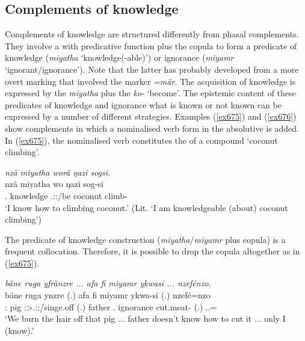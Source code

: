 \subsection{Complements of knowledge}\label{complknow}

Complements of knowledge are structured differently from phasal complements. They involve a  with predicative function plus the copula to form a predicate of knowledge (\emph{miyatha} `knowledge(-able)') or ignorance (\emph{miyamr} `ignorant/ignorance'). Note that the latter has probably developed from a more overt marking that involved the   marker \emph{=mär}. The acquisition of knowledge is expressed by the  \emph{miyatha} plus the  \emph{ko-} `become'. The epistemic content of these predicates of knowledge and ignorance \textendash{} what is known or not known \textendash{} can be expressed by a number of different strategies. Examples (\ref{ex675}) and (\ref{ex676}) show complements in which a nominalised verb form in the absolutive is added. In (\ref{ex675}), the nominalised verb constitutes the  of a compound `coconut climbing'.

\begin{exe}
	\ex \emph{nzä miyatha worä ŋazi sogsi.}\\
	\gll nzä miyatha wo ŋazi sog-si\\
	\Fsg.\Abs{} knowledge \Fsg.\Sbj:\Nonpast:\Ipfv/be coconut climb-\Nmlz{}\\
	\trans `I know how to climbing coconut.' (Lit. `I am knowledgeable (about) coconut climbing')
	\label{ex675}
\end{exe}

The predicate of knowledge construction (\emph{miyatha}/\emph{miyamr} plus copula) is a frequent collocation. Therefore, it is possible to drop the copula altogether as in (\ref{ex675}).

\begin{exe}
	\ex \emph{bäne ruga yfränzre ... afa fi miyamr ykwasi ... nzefénzo.}\\
	\gll bäne ruga ynzre (.) afa fi miyamr ykwa-si (.) nzefé=nzo\\
	\Dem:\Med{} pig \Fpl:\Sbj>\Tsg.\Masc:\Nonpast:\Ipfv/singe.off (.) father \Third.\Abs{} ignorance cut.meat-\Nmlz{} (.) \Fsg.\Erg.\Emph=\Only{}\\
	\trans `We burn the hair off that pig ... father doesn't know how to cut it ... only I (know).'
	\label{ex676}
\end{exe}

